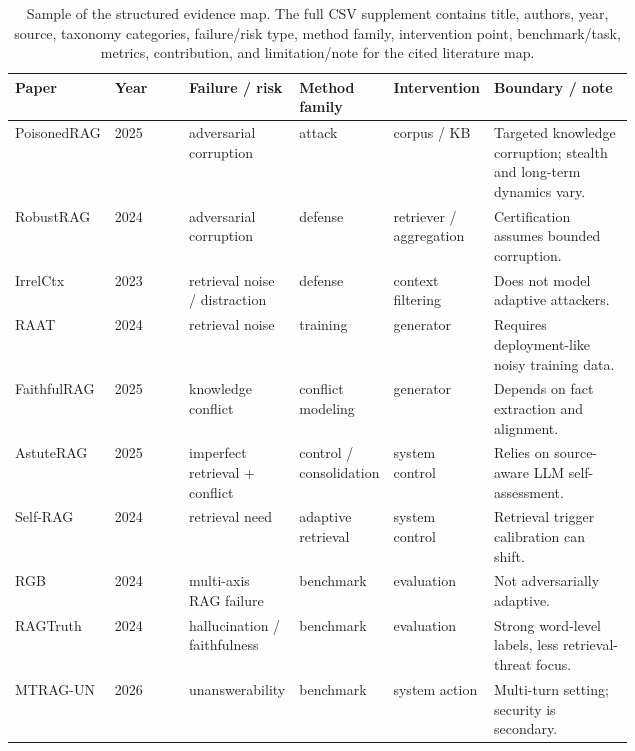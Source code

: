 \documentclass[11pt]{article}
\begin{document}
\label{sec:lit-map}
\begin{table}[t]
\centering
\scriptsize
\renewcommand{\arraystretch}{0.92}
\begin{tabularx}{\linewidth}{p{0.13\linewidth}p{0.12\linewidth}p{0.16\linewidth}p{0.15\linewidth}p{0.16\linewidth}X}
\toprule
\textbf{Paper} & \textbf{Year} & \textbf{Failure / risk} & \textbf{Method family} & \textbf{Intervention} & \textbf{Boundary / note} \\
\midrule
PoisonedRAG & 2025 & adversarial corruption & attack & corpus / KB & Targeted knowledge corruption; stealth and long-term dynamics vary. \\
RobustRAG & 2024 & adversarial corruption & defense & retriever / aggregation & Certification assumes bounded corruption. \\
IrrelCtx & 2023 & retrieval noise / distraction & defense & context filtering & Does not model adaptive attackers. \\
RAAT & 2024 & retrieval noise & training & generator & Requires deployment-like noisy training data. \\
FaithfulRAG & 2025 & knowledge conflict & conflict modeling & generator & Depends on fact extraction and alignment. \\
AstuteRAG & 2025 & imperfect retrieval + conflict & control / consolidation & system control & Relies on source-aware LLM self-assessment. \\
Self-RAG & 2024 & retrieval need & adaptive retrieval & system control & Retrieval trigger calibration can shift. \\
RGB & 2024 & multi-axis RAG failure & benchmark & evaluation & Not adversarially adaptive. \\
RAGTruth & 2024 & hallucination / faithfulness & benchmark & evaluation & Strong word-level labels, less retrieval-threat focus. \\
MTRAG-UN & 2026 & unanswerability & benchmark & system action & Multi-turn setting; security is secondary. \\
\bottomrule
\end{tabularx}
\caption{Sample of the structured evidence map. The full CSV supplement contains title, authors, year, source, taxonomy categories, failure/risk type, method family, intervention point, benchmark/task, metrics, contribution, and limitation/note for the cited literature map.}
\label{tab:evidence-map-sample}
\end{table}


\end{document}
